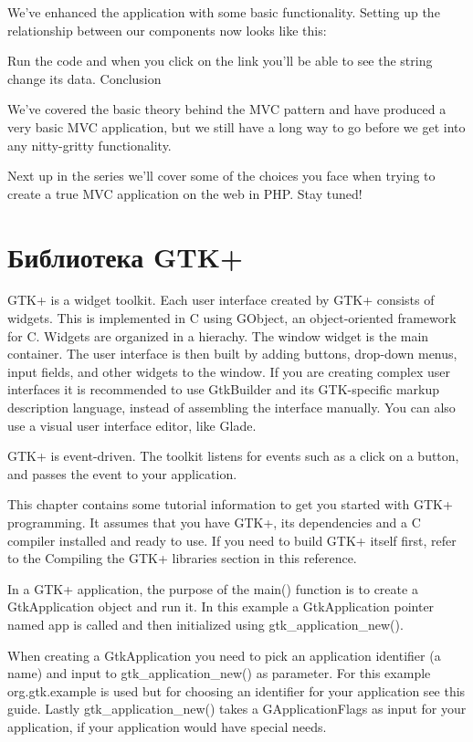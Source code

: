 \documentclass[a4paper,openany,twoside,draft]{book}
\begin{document}
We’ve enhanced the application with some basic functionality. Setting up the relationship between our components now looks like this:

Run the code and when you click on the link you’ll be able to see the string change its data.
Conclusion

We’ve covered the basic theory behind the MVC pattern and have produced a very basic MVC application, but we still have a long way to go before we get into any nitty-gritty functionality.

Next up in the series we’ll cover some of the choices you face when trying to create a true MVC application on the web in PHP. Stay tuned!

\section{Библиотека GTK+}
\label{sec:gtk}

GTK+ is a widget toolkit. Each user interface created by GTK+ consists of widgets. This is implemented in C using GObject, an object-oriented framework for C. Widgets are organized in a hierachy. The window widget is the main container. The user interface is then built by adding buttons, drop-down menus, input fields, and other widgets to the window. If you are creating complex user interfaces it is recommended to use GtkBuilder and its GTK-specific markup description language, instead of assembling the interface manually. You can also use a visual user interface editor, like Glade.

GTK+ is event-driven. The toolkit listens for events such as a click on a button, and passes the event to your application.

This chapter contains some tutorial information to get you started with GTK+ programming. It assumes that you have GTK+, its dependencies and a C compiler installed and ready to use. If you need to build GTK+ itself first, refer to the Compiling the GTK+ libraries section in this reference.

In a GTK+ application, the purpose of the main() function is to create a GtkApplication object and run it. In this example a GtkApplication pointer named app is called and then initialized using gtk\_application\_new().

When creating a GtkApplication you need to pick an application identifier (a name) and input to gtk\_application\_new() as parameter. For this example org.gtk.example is used but for choosing an identifier for your application see this guide. Lastly gtk\_application\_new() takes a GApplicationFlags as input for your application, if your application would have special needs.
\end{document}
